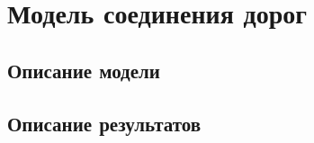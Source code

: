 \section{Модель соединения дорог}

\subsection{Описание модели}

\subsection{Описание результатов}

\clearpage